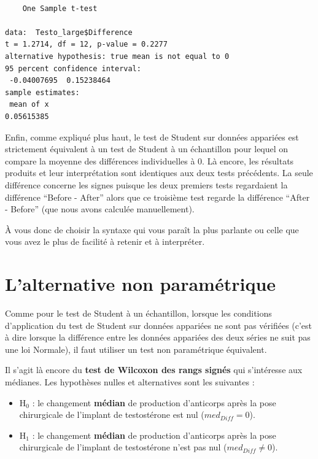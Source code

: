 \documentclass[
  a4paper,
  DIV=11,
  numbers=noendperiod,
  oneside]{scrreprt}
\providecommand{\tightlist}{%
  \setlength{\itemsep}{0pt}\setlength{\parskip}{0pt}}\usepackage{longtable,booktabs,array}
\begin{document}
\begin{verbatim}

    One Sample t-test

data:  Testo_large$Difference
t = 1.2714, df = 12, p-value = 0.2277
alternative hypothesis: true mean is not equal to 0
95 percent confidence interval:
 -0.04007695  0.15238464
sample estimates:
 mean of x 
0.05615385 
\end{verbatim}

Enfin, comme expliqué plus haut, le test de Student sur données
appariées est strictement équivalent à un test de Student à un
échantillon pour lequel on compare la moyenne des différences
individuelles à 0. Là encore, les résultats produits et leur
interprétation sont identiques aux deux tests précédents. La seule
différence concerne les signes puisque les deux premiers tests
regardaient la différence ``Before - After'' alors que ce troisième test
regarde la différence ``After - Before'' (que nous avons calculée
manuellement).

À vous donc de choisir la syntaxe qui vous paraît la plus parlante ou
celle que vous avez le plus de facilité à retenir et à interpréter.

\hypertarget{lalternative-non-paramuxe9trique-1}{%
\section{L'alternative non
paramétrique}\label{lalternative-non-paramuxe9trique-1}}

Comme pour le test de Student à un échantillon, lorsque les conditions
d'application du test de Student sur données appariées ne sont pas
vérifiées (c'est à dire lorsque la différence entre les données
appariées des deux séries ne suit pas une loi Normale), il faut utiliser
un test non paramétrique équivalent.

Il s'agit là encore du \textbf{test de Wilcoxon des rangs signés} qui
s'intéresse aux médianes. Les hypothèses nulles et alternatives sont les
suivantes :

\begin{itemize}
\tightlist
\item
  H\(_0\) : le changement \textbf{médian} de production d'anticorps
  après la pose chirurgicale de l'implant de testostérone est nul
  (\(med_{Diff} = 0\)).
\item
  H\(_1\) : le changement \textbf{médian} de production d'anticorps
  après la pose chirurgicale de l'implant de testostérone n'est pas nul
  (\(med_{Diff} \neq 0\)).
\end{itemize}
\end{document}
